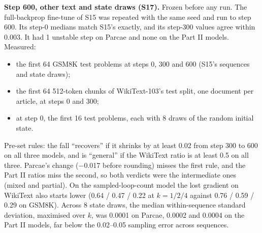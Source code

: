 \documentclass[10pt]{article}
\begin{document}
\textbf{Step 600, other text and state draws (S17).} Frozen before any run. The full-backprop fine-tune of S15 was repeated with the same seed and run to step 600. Its step-0 medians match S15's exactly, and its step-300 values agree within 0.003. It had 1 unstable step on Parcae and none on the Part II models. Measured:

\begin{itemize}
\item the first 64 GSM8K test problems at steps 0, 300 and 600 (S15's sequences and state draws);
\item the first 64 512-token chunks of WikiText-103's test split, one document per article, at steps 0 and 300;
\item at step 0, the first 16 test problems, each with 8 draws of the random initial state.
\end{itemize}

\begin{table}[!htbp]
\centering\small
\caption{The fall at steps 300 and 600, and on unrelated text (S17; falls from the trained model, averaged over $k = 1$, 2, 4, all parameters, medians over 64 sequences).}
\label{tab:12}
\end{table}


Pre-set rules: the fall ``recovers'' if it shrinks by at least 0.02 from step 300 to 600 on all three models, and is ``general'' if the WikiText ratio is at least 0.5 on all three. Parcae's change ($-$0.017 before rounding) misses the first rule, and the Part II ratios miss the second, so both verdicts were the intermediate ones (mixed and partial). On the sampled-loop-count model the lost gradient on WikiText also starts lower (0.64 / 0.47 / 0.22 at $k = 1 / 2 / 4$ against 0.76 / 0.59 / 0.29 on GSM8K). Across 8 state draws, the median within-sequence standard deviation, maximised over $k$, was 0.0001 on Parcae, 0.0002 and 0.0004 on the Part II models, far below the 0.02--0.05 sampling error across sequences.
\end{document}
